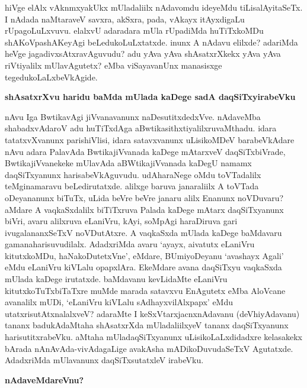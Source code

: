 hiVge elAlx vAknmxyakUkx mUladaliilx nAdavomdu ideyeMdu tiLisalAyitaSeTx. I nAdada naMtaraveV savxra, akSxra, pada, vAkayx itAyxdigaLu rUpagoLuLxvuvu. elalxvU adaradara mUla rUpadiMda huTiTxkoMDu shAKoVpashAKeyAgi beLedukoLuLxtatxde. inunx A nAdavu elilxde? adariMda heVge jagadivxsAtxravAguvudu? adu yAva yAva shAsatxrXkekx yAva yAva riVtiyalilx mUlavAgutetx? eMba viSayavanUnx manasisxge tegedukoLaLxbeVkAgide.

{\bf shAsatxrXvu haridu baMda mUlada kaDege sadA daqSiTxyirabeVku}

nAvu Iga BwtikavAgi jiVvanavanunx naDesutitxdedxVve. nAdaveMba shabadxvAdaroV adu huTiTxdAga aBwtikasithxtiyalilxruvaMthadu. idara tatatxvXvanunx parishiVlisi, idara satavxvanunx uLisikoMDeV barabeVkAdare nAvu adara PalavAda BwtikajiVvanada kaDege mAtarxveV daqSiTxbiVrade, BwtikajiVvanekeke mUlavAda aBWtikajiVvanada kaDegU namamx daqSiTxyanunx harisabeVkAguvudu. udAharaNege oMdu toVTadalilx teMginamaravu beLedirutatxde. alilxge baruva janaraliilx A toVTada oDeyananunx biTuTx, uLida beVre beVre janaru alilx Enanunx noVDuvaru? aMdare A vaqkaSxdalilx biTiTxruva Palada kaDege mAtarx daqSiTxyanunx biVri, avaru alilxruva eLaniVru, kAyi, soMpAgi haraDiruva gari ivugalananxSeTxV noVDutAtxre. A vaqkaSxda mUlada kaDege baMdavaru gamanaharisuvudilalx. AdadxriMda avaru `ayayx, aivatutx eLaniVru kitutxkoMDu, haNakoDutetxVne', eMdare, BUmiyoDeyanu `avashayx Agali' eMdu eLaniVru kiVLalu opapxlAra. EkeMdare avana daqSiTxyu vaqkaSxda mUlada kaDege irutatxde. baMdavanu kevLidaMte eLaniVru kitutxkoTuTxbiTaTxre muMde marada satavxvu EnAgutetx eMba AloVcane avanalilx mUDi, `eLaniVru kiVLalu sAdhayxvilAlxpapx' eMdu utatxrisutAtxnalalxveV? adaraMte I keSxVtarxjacnxnAdavanu (deVhiyAdavanu) tananx badukAdaMtaha shAsatxrXda mUladaliilxyeV tananx daqSiTxyanunx harisutitxrabeVku. aMtaha mUladaqSiTxyanunx uLisikoLaLxdidadxre kelasakekx bArada nAnAvAda-vivAdagaLige avakAsha mADikoDuvudaSeTxV Agutatxde. AdadxriMda mUlavanunx daqSiTxsutatxleV irabeVku.

{\bf nAdaveMdareVnu?}

